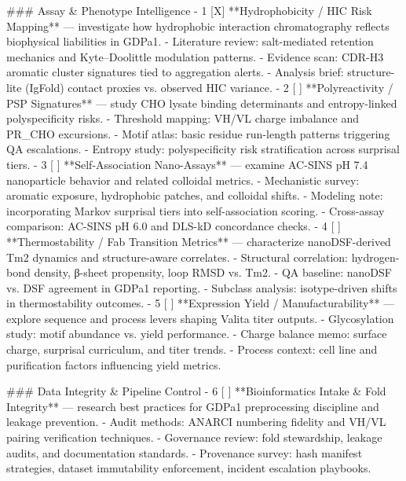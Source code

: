 ### Assay & Phenotype Intelligence
- 1 [X] **Hydrophobicity / HIC Risk Mapping** — investigate how hydrophobic interaction chromatography reflects biophysical liabilities in GDPa1.
  - Literature review: salt-mediated retention mechanics and Kyte–Doolittle modulation patterns.
  - Evidence scan: CDR-H3 aromatic cluster signatures tied to aggregation alerts.
  - Analysis brief: structure-lite (IgFold) contact proxies vs. observed HIC variance.
- 2 [ ] **Polyreactivity / PSP Signatures** — study CHO lysate binding determinants and entropy-linked polyspecificity risks.
  - Threshold mapping: VH/VL charge imbalance and PR_CHO excursions.
  - Motif atlas: basic residue run-length patterns triggering QA escalations.
    - Entropy study: polyspecificity risk stratification across surprisal tiers.
- 3 [ ] **Self-Association Nano-Assays** — examine AC-SINS pH 7.4 nanoparticle behavior and related colloidal metrics.
  - Mechanistic survey: aromatic exposure, hydrophobic patches, and colloidal shifts.
  - Modeling note: incorporating Markov surprisal tiers into self-association scoring.
  - Cross-assay comparison: AC-SINS pH 6.0 and DLS-kD concordance checks.
- 4 [ ] **Thermostability / Fab Transition Metrics** — characterize nanoDSF-derived Tm2 dynamics and structure-aware correlates.
  - Structural correlation: hydrogen-bond density, β-sheet propensity, loop RMSD vs. Tm2.
  - QA baseline: nanoDSF vs. DSF agreement in GDPa1 reporting.
  - Subclass analysis: isotype-driven shifts in thermostability outcomes.
- 5 [ ] **Expression Yield / Manufacturability** — explore sequence and process levers shaping Valita titer outputs.
  - Glycosylation study: motif abundance vs. yield performance.
  - Charge balance memo: surface charge, surprisal curriculum, and titer trends.
  - Process context: cell line and purification factors influencing yield metrics.

### Data Integrity & Pipeline Control
- 6 [ ] **Bioinformatics Intake & Fold Integrity** — research best practices for GDPa1 preprocessing discipline and leakage prevention.
  - Audit methods: ANARCI numbering fidelity and VH/VL pairing verification techniques.
  - Governance review: fold stewardship, leakage audits, and documentation standards.
  - Provenance survey: hash manifest strategies, dataset immutability enforcement, incident escalation playbooks.

